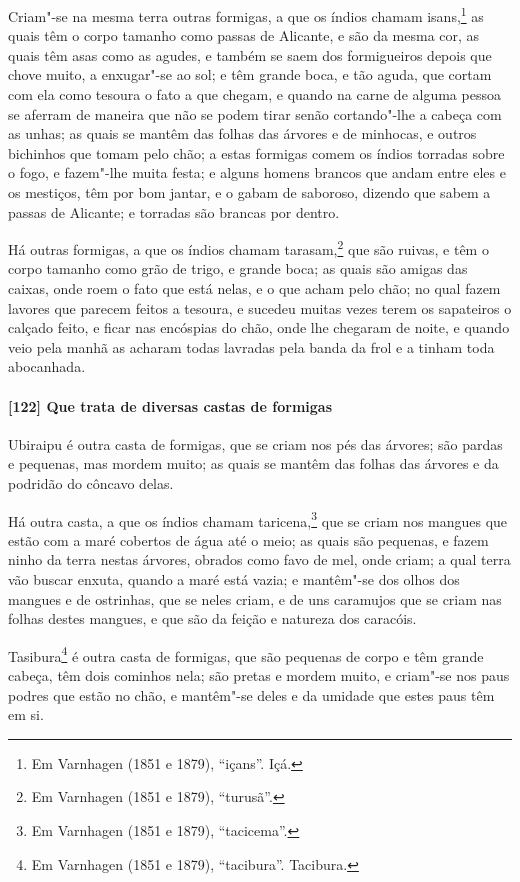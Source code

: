 \begin{linenumbers}
Criam"-se na mesma terra outras formigas, a que os índios chamam isans,\footnote{ Em
Varnhagen (1851 e 1879), ``içans''. Içá.} as quais têm o corpo tamanho como passas de
Alicante, e são da mesma cor, as quais têm asas como as agudes, e também se saem dos
formigueiros depois que chove muito, a enxugar"-se ao sol; e têm grande boca, e tão aguda,
que cortam com ela como tesoura o fato a que chegam, e quando na carne de alguma pessoa se
aferram de maneira que não se podem tirar senão cortando"-lhe a cabeça com as unhas; as
quais se mantêm das folhas das árvores e de minhocas, e outros bichinhos que tomam pelo
chão; a estas formigas comem os índios torradas sobre o fogo, e fazem"-lhe muita festa; e
alguns homens brancos que andam entre eles e os mestiços, têm por bom jantar, e o gabam de
saboroso, dizendo que sabem a passas de Alicante; e torradas são brancas por dentro.

Há outras formigas, a que os índios chamam tarasam,\footnote{ Em Varnhagen (1851 e 1879),
``turusã''.} que são ruivas, e têm o corpo tamanho como grão de trigo, e grande boca; as
quais são amigas das caixas, onde roem o fato que está nelas, e o que acham pelo chão; no
qual fazem lavores que parecem feitos a tesoura, e sucedeu muitas vezes terem os
sapateiros o calçado feito, e ficar nas encóspias do chão, onde lhe chegaram de noite, e
quando veio pela manhã as acharam todas lavradas pela banda da frol e a tinham toda
abocanhada.

\paragraph{[122] Que trata de diversas castas de formigas}\quad
Ubiraipu é outra casta de formigas, que se criam nos pés das árvores; são pardas e
pequenas, mas mordem muito; as quais se mantêm das folhas das árvores e da podridão do
côncavo delas.

Há outra casta, a que os índios chamam taricena,\footnote{ Em Varnhagen (1851 e 1879),
``tacicema''.} que se criam nos mangues que estão com a maré cobertos de água até o meio;
as quais são pequenas, e fazem ninho da terra nestas árvores, obrados como favo de mel,
onde criam; a qual terra vão buscar enxuta, quando a maré está vazia; e mantêm"-se dos
olhos dos mangues e de ostrinhas, que se neles criam, e de uns caramujos que se criam nas
folhas destes mangues, e que são da feição e natureza dos caracóis.

Tasibura\footnote{ Em Varnhagen (1851 e 1879), ``tacibura''. Tacibura.} é outra casta de
formigas, que são pequenas de corpo e têm grande cabeça, têm dois cominhos nela; são
pretas e mordem muito, e criam"-se nos paus podres que estão no chão, e mantêm"-se deles e
da umidade que estes paus têm em si.


\end{linenumbers}
